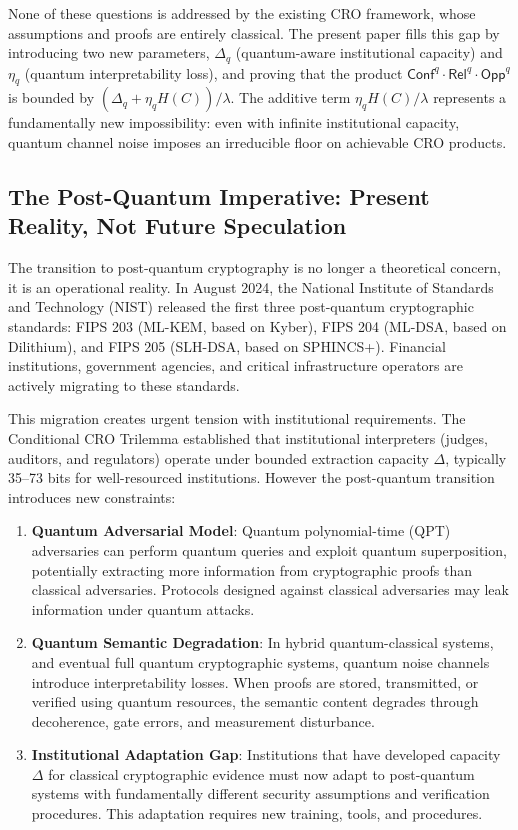 \documentclass{ieeeaccess}
\newcommand{\Conf}{\mathsf{Conf}}
\newcommand{\Rel}{\mathsf{Rel}}
\newcommand{\Opp}{\mathsf{Opp}}
\begin{document}
None of these questions is addressed by the existing CRO framework, 
whose assumptions and proofs are entirely classical. The present paper 
fills this gap by introducing two new parameters, $\Delta_q$ 
(quantum-aware institutional capacity) and $\eta_q$ (quantum 
interpretability loss), and proving that the product 
$\Conf^q \cdot \Rel^q \cdot \Opp^q$ is bounded by 
$(\Delta_q + \eta_q H(C))/\lambda$. The additive term $\eta_q H(C)/\lambda$ 
represents a fundamentally new impossibility: even with 
infinite institutional capacity, quantum channel noise 
imposes an irreducible floor on achievable CRO products.


\subsection{The Post-Quantum Imperative: Present Reality, Not Future Speculation}

The transition to post-quantum cryptography is no longer a theoretical concern, it is an operational reality. In August 2024, the National Institute of Standards and Technology (NIST) released the first three post-quantum cryptographic standards: FIPS 203 (ML-KEM, based on Kyber), FIPS 204 (ML-DSA, based on Dilithium), and FIPS 205 (SLH-DSA, based on SPHINCS+). Financial institutions, government agencies, and critical infrastructure operators are actively migrating to these standards.

This migration creates urgent tension with institutional requirements. The Conditional CRO Trilemma established that institutional interpreters (judges, auditors, and regulators) operate under bounded extraction capacity $\Delta$, typically 35--73 bits for well-resourced institutions. However the post-quantum transition introduces new constraints:

\begin{enumerate}
    \item \textbf{Quantum Adversarial Model}: Quantum polynomial-time (QPT) adversaries can perform quantum queries and exploit quantum superposition, potentially extracting more information from cryptographic proofs than classical adversaries. Protocols designed against classical adversaries may leak information under quantum attacks.

    \item \textbf{Quantum Semantic Degradation}: In hybrid quantum-classical systems, and eventual full quantum cryptographic systems, quantum noise channels introduce interpretability losses. When proofs are stored, transmitted, or verified using quantum resources, the semantic content degrades through decoherence, gate errors, and measurement disturbance.

    \item \textbf{Institutional Adaptation Gap}: Institutions that have developed capacity $\Delta$ for classical cryptographic evidence must now adapt to post-quantum systems with fundamentally different security assumptions and verification procedures. This adaptation requires new training, tools, and procedures.
\end{enumerate}
\end{document}
